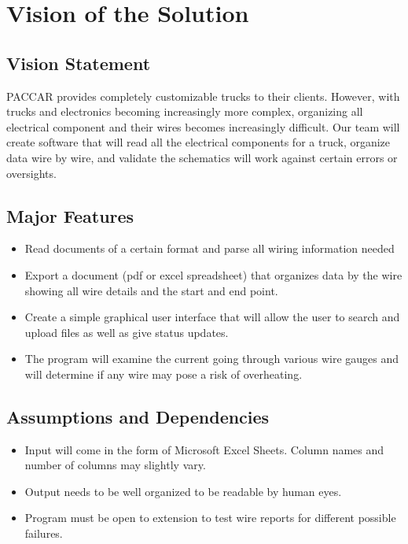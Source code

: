\section{Vision of the Solution}
\subsection{Vision Statement}
    PACCAR provides completely customizable trucks to their clients. However, with trucks and electronics becoming increasingly more complex, organizing all electrical component and their wires becomes increasingly difficult. Our team will create software that will read all the electrical components for a truck, organize data wire by wire, and validate the schematics will work against certain errors or oversights.  

\subsection{Major Features}
\begin{itemize}
    \item Read documents of a certain format and parse all wiring information needed
    \item Export a document (pdf or excel spreadsheet) that organizes data by the wire showing all wire details and the start and end point.
    \item Create a simple graphical user interface that will allow the user to search and upload files as well as give status updates.
    \item The program will examine the current going through various wire gauges and will determine if any wire may pose a risk of overheating.
\end{itemize}

\subsection{Assumptions and Dependencies}  
\begin{itemize}
    \item Input will come in the form of Microsoft Excel Sheets. Column names and number of columns may slightly vary. 
    \item Output needs to be well organized to be readable by human eyes. 
    \item Program must be open to extension to test wire reports for different possible failures.
\end{itemize}



